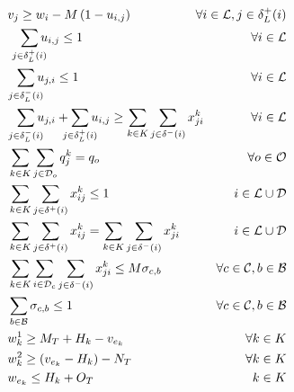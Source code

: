 \documentclass{article}
\begin{document}
\begin{alignat}{3}
    \label{mod:c20} & v_{j} \geq w_{i} - M\left(1- u_{i,j}\right) & \hspace{-20mm}  \forall i \in \mathcal{L}, j \in \delta^{+}_{L}(i) \\
   \label{mod:c21} & \hspace{3mm} \smashoperator{ \sum_{ j \in \delta^{+}_{L}(i)}}{u_{i,j } } \leq 1 & \hspace{-20mm}  \forall i \in \mathcal{L} \\
    \label{mod:c22} & \hspace{2mm} \smashoperator{ \sum_{ j \in \delta^{-}_{L}(i)}}{u_{j,i } } \leq 1 & \hspace{-20mm} \forall i \in \mathcal{L} \\
    \label{mod:c23} & \hspace{2mm} \smashoperator{ \sum_{ j \in \delta^{-}_{L}(i)}}{u_{j,i } } + \smashoperator{ \sum_{ j \in \delta^{+}_{L}(i)}}{u_{i,j } } \geq \sum_{k \in K}\sum_{j \in  \delta^{-}(i) }{x^k_{ji}} & \hspace{-20mm} \forall i \in \mathcal{L} \\
    \label{mod:c24} & \sum_{k \in K}\sum_{j \in \mathcal{D}_o}{q^k_j} = q_o & \hspace{-20mm}  \forall o \in \mathcal{O} \\
    \label{mod:c25} &  \sum_{k \in K}\sum_{j \in \delta^{+}(i)}{x^{k}_{ij} \leq 1} &  i \in \mathcal{L} \cup \mathcal{D} \\
  \label{mod:c26}  &  \sum_{k \in K}\sum_{j \in \delta^{+}(i)} {x^{k}_{ij} } =  \sum_{k \in K}\sum_{j \in \delta^{-}(i)}{x^{k}_{ji} } &  i \in \mathcal{L} \cup \mathcal{D} \\
  \label{mod:c27} & \sum_{k \in K}  \sum_{i \in \mathcal{D}_c} \sum_{j \in \delta^{-}(i) }  {x^k_{ji}} \leq M\sigma_{c, b} & \forall c \in \mathcal{C}, b \in \mathcal{B} \\
    \label{mod:c28} & \sum_{b \in \mathcal{B}} \sigma_{c, b} \leq 1 & \hspace{-20mm}\forall c \in \mathcal{C}, b \in \mathcal{B} \\
    \label{mod:c29} & w^1_k \geq  M_T + H_k - v_{e_k}  & \hspace{-20mm} \forall k \in K \\
    \label{mod:c30} & w^2_k \geq (v_{e_k} - H_k) - N_T & \hspace{-20mm} \forall k \in K \\
    \label{mod:c31}  & w_{e_k} \leq H_k + O_T  & \hspace{-00mm}  k \in K \hspace{0mm} \\

\end{alignat}
\end{document}
